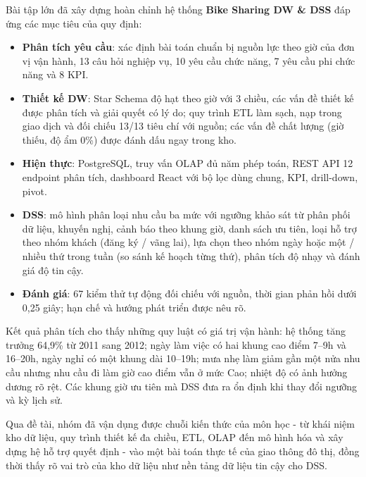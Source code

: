 \newpage
{}\label{sec:conclusion}
Bài tập lớn đã xây dựng hoàn chỉnh hệ thống \textbf{Bike Sharing DW \& DSS} đáp ứng các mục tiêu của quy định:
\begin{itemize}
    \item \textbf{Phân tích yêu cầu}: xác định bài toán chuẩn bị nguồn lực theo giờ của đơn vị vận hành, 13 câu hỏi nghiệp vụ, 10 yêu cầu chức năng, 7 yêu cầu phi chức năng và 8 KPI.
    \item \textbf{Thiết kế DW}: Star Schema độ hạt theo giờ với 3 chiều, các vấn đề thiết kế được phân tích và giải quyết có lý do; quy trình ETL làm sạch, nạp trong giao dịch và đối chiếu 13/13 tiêu chí với nguồn; các vấn đề chất lượng (giờ thiếu, độ ẩm 0\%) được đánh dấu ngay trong kho.
    \item \textbf{Hiện thực}: PostgreSQL, truy vấn OLAP đủ năm phép toán, REST API 12 endpoint phân tích, dashboard React với bộ lọc dùng chung, KPI, drill-down, pivot.
    \item \textbf{DSS}: mô hình phân loại nhu cầu ba mức với ngưỡng khảo sát từ phân phối dữ liệu, khuyến nghị, cảnh báo theo khung giờ, danh sách ưu tiên, loại hỗ trợ theo nhóm khách (đăng ký / vãng lai), lựa chọn theo nhóm ngày hoặc một / nhiều thứ trong tuần (so sánh kế hoạch từng thứ), phân tích độ nhạy và đánh giá độ tin cậy.
    \item \textbf{Đánh giá}: 67 kiểm thử tự động đối chiếu với nguồn, thời gian phản hồi dưới 0,25 giây; hạn chế và hướng phát triển được nêu rõ.
\end{itemize}
Kết quả phân tích cho thấy những quy luật có giá trị vận hành: hệ thống tăng trưởng 64,9\% từ 2011 sang 2012; ngày làm việc có hai khung cao điểm 7--9h và 16--20h, ngày nghỉ có một khung dài 10--19h; mưa nhẹ làm giảm gần một nửa nhu cầu nhưng nhu cầu đi làm giờ cao điểm vẫn ở mức Cao; nhiệt độ có ảnh hưởng dương rõ rệt. Các khung giờ ưu tiên mà DSS đưa ra ổn định khi thay đổi ngưỡng và kỳ lịch sử.

Qua đề tài, nhóm đã vận dụng được chuỗi kiến thức của môn học - từ khái niệm kho dữ liệu, quy trình thiết kế đa chiều, ETL, OLAP đến mô hình hóa và xây dựng hệ hỗ trợ quyết định - vào một bài toán thực tế của giao thông đô thị, đồng thời thấy rõ vai trò của kho dữ liệu như nền tảng dữ liệu tin cậy cho DSS.
